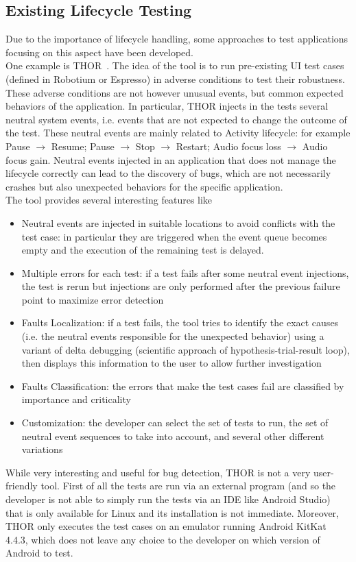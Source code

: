 \documentclass[11pt,a4paper,notitlepage]{article}
\begin{document}
\subsection{Existing Lifecycle Testing}
Due to the importance of lifecycle handling, some approaches to test applications focusing on this aspect have been developed.\bigskip \\
One example is THOR~\cite{Adamsen:2015:SEA:2771783.2771786}. The idea of the tool is to run pre-existing UI test cases (defined in Robotium or Espresso) in adverse conditions to test their robustness. These adverse conditions are not however unusual events, but common expected behaviors of the application. In particular, THOR injects in the tests several neutral system events, i.e. events that are not expected to change the outcome of the test. These neutral events are mainly related to Activity lifecycle: for example Pause $\rightarrow$ Resume; Pause $\rightarrow$ Stop $\rightarrow$ Restart; Audio
focus loss $\rightarrow$ Audio focus gain. Neutral events injected in an application that does not manage the lifecycle correctly can lead to the discovery of bugs, which are not necessarily crashes but also unexpected behaviors for the specific application.\smallskip \\
The tool provides several interesting features like
\begin{itemize}
	\item Neutral events are injected in suitable locations to avoid conflicts with the test case: in particular they are triggered when the event queue becomes empty and the execution of the remaining test is delayed.
	\item Multiple errors for each test: if a test fails after some neutral event injections, the test is rerun but injections are only performed after the previous failure point to maximize error detection
	\item Faults Localization: if a test fails, the tool tries to identify the exact causes (i.e. the neutral events responsible for the unexpected behavior) using a variant of delta debugging (scientific approach of hypothesis-trial-result loop), then displays this information to the user to allow further investigation
	\item Faults Classification: the errors that make the test cases fail are classified by importance and criticality
	\item Customization: the developer can select the set of tests to run,
the set of neutral event sequences to take into account, and
several other different variations
\end{itemize}
While very interesting and useful for bug detection, THOR is not a very user-friendly tool. First of all the tests are run via an external program (and so the developer is not able to simply run the tests via an IDE like Android Studio) that is only available for Linux and its installation is not immediate. Moreover, THOR only executes the test cases on an emulator running Android KitKat 4.4.3, which does not leave any choice to the developer on which version of Android to test.
\end{document}
